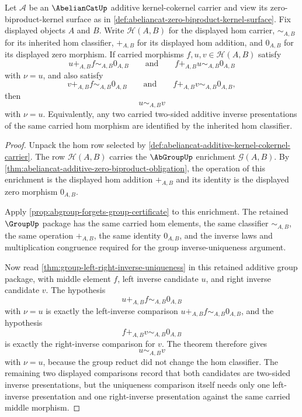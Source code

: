 \begin{theorem}
\label{thm:abeliancat-hom-additive-inverse-uniqueness}
Let $\mathcal A$ be an $\AbelianCatUp$ additive kernel-cokernel carrier and
view its zero-biproduct-kernel surface as in
\autoref{def:abeliancat-zero-biproduct-kernel-surface}. Fix displayed objects
$A$ and $B$. Write $\mathcal H(A,B)$ for the displayed hom carrier,
$\sim_{A,B}$ for its inherited hom classifier, $+_{A,B}$ for its displayed hom
addition, and $0_{A,B}$ for its displayed zero morphism. If carried morphisms
$f,u,v\in\mathcal H(A,B)$ satisfy
$$
u+_{A,B}f\sim_{A,B}0_{A,B}
\qquad\text{and}\qquad
f+_{A,B}u\sim_{A,B}0_{A,B}
$$
with $\nu=u$, and also satisfy
$$
v+_{A,B}f\sim_{A,B}0_{A,B}
\qquad\text{and}\qquad
f+_{A,B}v\sim_{A,B}0_{A,B},
$$
then
$$
u\sim_{A,B}v
$$
with $\nu=u$. Equivalently, any two carried two-sided additive inverse
presentations of the same carried hom morphism are identified by the inherited
hom classifier.
\end{theorem}
\begin{proof}
Unpack the hom row selected by
\autoref{def:abeliancat-additive-kernel-cokernel-carrier}. The row
$\mathcal H(A,B)$ carries the $\AbGroupUp$ enrichment $\mathcal G(A,B)$. By
\autoref{thm:abeliancat-additive-zero-biproduct-obligation}, the operation of
this enrichment is the displayed hom addition $+_{A,B}$ and its identity is the
displayed zero morphism $0_{A,B}$.

Apply \autoref{prop:abgroup-forgets-group-certificate} to this enrichment. The
retained $\GroupUp$ package has the same carried hom elements, the same
classifier $\sim_{A,B}$, the same operation $+_{A,B}$, the same identity
$0_{A,B}$, and the inverse laws and multiplication congruence required for the
group inverse-uniqueness argument.

Now read \autoref{thm:group-left-right-inverse-uniqueness} in this retained
additive group package, with middle element $f$, left inverse candidate $u$,
and right inverse candidate $v$. The hypothesis
$$
u+_{A,B}f\sim_{A,B}0_{A,B}
$$
with $\nu=u$ is exactly the left-inverse comparison $u+_{A,B}f\sim_{A,B}0_{A,B}$,
and the hypothesis
$$
f+_{A,B}v\sim_{A,B}0_{A,B}
$$
is exactly the right-inverse comparison for $v$. The theorem therefore gives
$$
u\sim_{A,B}v
$$
with $\nu=u$, because the group reduct did not change the hom classifier. The
remaining two displayed comparisons record that both candidates are two-sided
inverse presentations, but the uniqueness comparison itself needs only one
left-inverse presentation and one right-inverse presentation against the same
carried middle morphism.
\end{proof}
